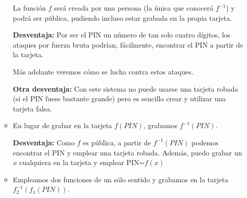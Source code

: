 \begin{enumerate}
\begin{itemize}
La función $f$ será creada por una persona (la única que conocerá $f^{-1}$) y podrá ser pública, pudiendo incluso estar grabada en la propia tarjeta.

\textbf{Desventaja:} Por ser el PIN un número de tan solo cuatro dígitos, los ataques por fuerza bruta podrían, fácilmente, encontrar el PIN a partir de la tarjeta.

Más adelante veremos cómo se lucha contra estos ataques.

\textbf{Otra desventaja:} Con este sistema no puede usarse una tarjeta robada (si el PIN fuese bastante grande) pero es sencillo crear y utilizar una tarjeta falsa.

\item En lugar de grabar en la tarjeta $f(PIN)$, grabamos $f^{-1}(PIN)$.

\textbf{Desventaja:} Como $f$ es pública, a partir de $f^{-1}(PIN)$ podemos encontrar el PIN y emplear una tarjeta robada. Además, puedo grabar un $x$ cualquiera en la tarjeta y emplear PIN=$f(x)$

\item Empleamos dos funciones de un sólo sentido y grabamos en la tarjeta $f_2^{-1}(f_1(PIN))$.

\end{itemize}

\end{enumerate}